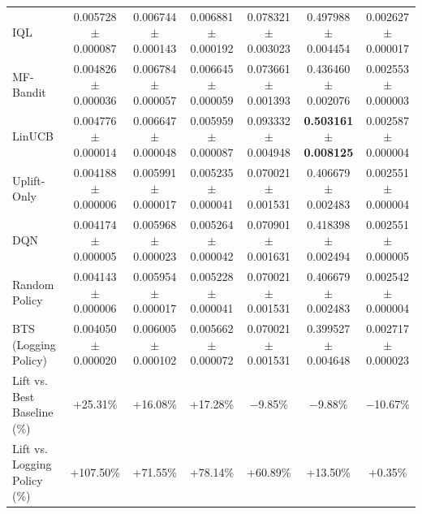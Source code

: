 \documentclass[preprint,12pt,3p]{elsarticle}
\begin{document}
\begin{table}[t]
\begin{tabular*}{\textwidth}{@{\extracolsep{\fill}}lcccccc@{}}
IQL \cite{kostrikov2021offline} & 0.005728 $\pm$ 0.000087 & 0.006744 $\pm$ 0.000143 & 0.006881 $\pm$ 0.000192 & 0.078321 $\pm$ 0.003023 & 0.497988 $\pm$ 0.004454 & 0.002627 $\pm$ 0.000017 \\
MF-Bandit \cite{mnih2008probabilistic} & 0.004826 $\pm$ 0.000036 & 0.006784 $\pm$ 0.000057 & 0.006645 $\pm$ 0.000059 & 0.073661 $\pm$ 0.001393 & 0.436460 $\pm$ 0.002076 & 0.002553 $\pm$ 0.000003 \\
LinUCB \cite{li2010contextual} & 0.004776 $\pm$ 0.000014 & 0.006647 $\pm$ 0.000048 & 0.005959 $\pm$ 0.000087 & 0.093332 $\pm$ 0.004948 & \textbf{0.503161 $\pm$ 0.008125} & 0.002587 $\pm$ 0.000004 \\
Uplift-Only \cite{kunzel2019metalearners} & 0.004188 $\pm$ 0.000006 & 0.005991 $\pm$ 0.000017 & 0.005235 $\pm$ 0.000041 & 0.070021 $\pm$ 0.001531 & 0.406679 $\pm$ 0.002483 & 0.002551 $\pm$ 0.000004 \\
DQN \cite{mnih2015human} & 0.004174 $\pm$ 0.000005 & 0.005968 $\pm$ 0.000023 & 0.005264 $\pm$ 0.000042 & 0.070901 $\pm$ 0.001631 & 0.418398 $\pm$ 0.002494 & 0.002551 $\pm$ 0.000005 \\
Random Policy & 0.004143 $\pm$ 0.000006 & 0.005954 $\pm$ 0.000017 & 0.005228 $\pm$ 0.000041 & 0.070021 $\pm$ 0.001531 & 0.406679 $\pm$ 0.002483 & 0.002542 $\pm$ 0.000004 \\
BTS (Logging Policy) \cite{saito2020open} & 0.004050 $\pm$ 0.000020 & 0.006005 $\pm$ 0.000102 & 0.005662 $\pm$ 0.000072 & 0.070021 $\pm$ 0.001531 & 0.399527 $\pm$ 0.004648 & 0.002717 $\pm$ 0.000023 \\
\midrule
Lift vs. Best Baseline (\%) & +25.31\% & +16.08\% & +17.28\% & $-$9.85\% & $-$9.88\% & $-$10.67\% \\
Lift vs. Logging Policy (\%) & +107.50\% & +71.55\% & +78.14\% & +60.89\% & +13.50\% & +0.35\% \\
\bottomrule
\end{tabular*}
\end{table}
\end{document}
